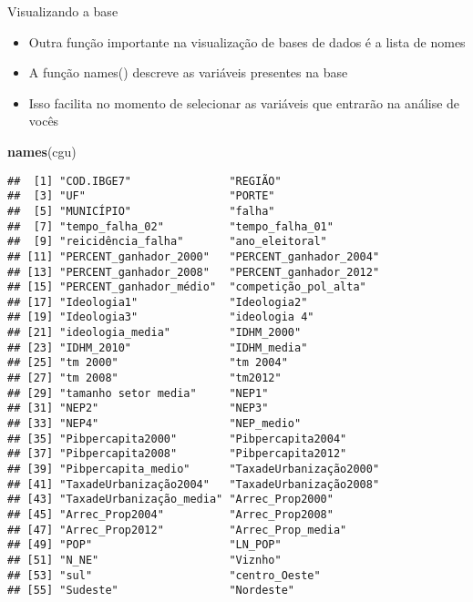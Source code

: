 \documentclass[
  10pt,
  ignorenonframetext,
]{beamer}
\newenvironment{Shaded}{\begin{snugshade}}{\end{snugshade}}
\newcommand{\KeywordTok}[1]{\textcolor[rgb]{0.13,0.29,0.53}{\textbf{#1}}}
\newcommand{\NormalTok}[1]{#1}
\providecommand{\tightlist}{%
  \setlength{\itemsep}{0pt}\setlength{\parskip}{0pt}}
\begin{document}
\begin{frame}[fragile]{Visualizando a base}
\protect\hypertarget{visualizando-a-base-3}{}
\begin{itemize}
\tightlist
\item
  Outra função importante na visualização de bases de dados é a lista de
  nomes
\item
  A função names() descreve as variáveis presentes na base
\item
  Isso facilita no momento de selecionar as variáveis que entrarão na
  análise de vocês
\end{itemize}

\begin{Shaded}
\begin{Highlighting}[]
\KeywordTok{names}\NormalTok{(cgu)}
\end{Highlighting}
\end{Shaded}

\begin{verbatim}
##  [1] "COD.IBGE7"               "REGIÃO"                 
##  [3] "UF"                      "PORTE"                  
##  [5] "MUNICÍPIO"               "falha"                  
##  [7] "tempo_falha_02"          "tempo_falha_01"         
##  [9] "reicidência_falha"       "ano_eleitoral"          
## [11] "PERCENT_ganhador_2000"   "PERCENT_ganhador_2004"  
## [13] "PERCENT_ganhador_2008"   "PERCENT_ganhador_2012"  
## [15] "PERCENT_ganhador_médio"  "competição_pol_alta"    
## [17] "Ideologia1"              "Ideologia2"             
## [19] "Ideologia3"              "ideologia 4"            
## [21] "ideologia_media"         "IDHM_2000"              
## [23] "IDHM_2010"               "IDHM_media"             
## [25] "tm 2000"                 "tm 2004"                
## [27] "tm 2008"                 "tm2012"                 
## [29] "tamanho setor media"     "NEP1"                   
## [31] "NEP2"                    "NEP3"                   
## [33] "NEP4"                    "NEP_medio"              
## [35] "Pibpercapita2000"        "Pibpercapita2004"       
## [37] "Pibpercapita2008"        "Pibpercapita2012"       
## [39] "Pibpercapita_medio"      "TaxadeUrbanização2000"  
## [41] "TaxadeUrbanização2004"   "TaxadeUrbanização2008"  
## [43] "TaxadeUrbanização_media" "Arrec_Prop2000"         
## [45] "Arrec_Prop2004"          "Arrec_Prop2008"         
## [47] "Arrec_Prop2012"          "Arrec_Prop_media"       
## [49] "POP"                     "LN_POP"                 
## [51] "N_NE"                    "Viznho"                 
## [53] "sul"                     "centro_Oeste"           
## [55] "Sudeste"                 "Nordeste"
\end{verbatim}
\end{frame}
\end{document}
